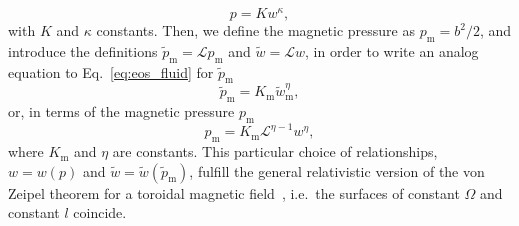 \documentclass{aa}
\begin{document}
\begin{equation}\label{eq:eos_fluid}
p = K w^{\kappa},
\end{equation}
with $K$ and $\kappa$ constants.
Then, we define the magnetic pressure as $p_{\mathrm{m}} = b^2/2$, and introduce the definitions $\tilde{p}_{\mathrm{m}} = \mathcal{L} p_{\mathrm{m}}$ and $\tilde{w} = \mathcal{L} w$, in order to write an analog equation to Eq.~\eqref{eq:eos_fluid} for $\tilde{p}_{\mathrm{m}}$~\citep{Komissarov:2006}
\begin{equation}\label{eq:eos_mag_tilde}
\tilde{p}_{\mathrm{m}} = K_{\mathrm{m}} \tilde{w}_{\mathrm{m}}^{\eta},
\end{equation}
or, in terms of the magnetic pressure $p_{\mathrm{m}}$
\begin{equation}\label{eq:eos_mag}
p_{\mathrm{m}} = K_{\mathrm{m}} \mathcal{L}^{\eta-1} w^{\eta},
\end{equation}
where $K_{\mathrm{m}}$ and $\eta$ are constants.
This particular choice of relationships, $w = w(p)$ and $\tilde{w} = \tilde{w}(\tilde{p}_{\mathrm{m}})$, fulfill the general relativistic version of the von Zeipel theorem for a toroidal magnetic field~\citep{vonZeipel:1924, Zanotti:2015}, i.e.~the surfaces of constant $\Omega$ and constant $l$ coincide.
\end{document}
